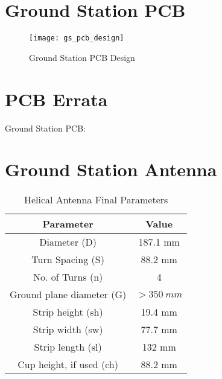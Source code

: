 


\section{Ground Station PCB}\label{sec:appendix_gs_pcb_design}
\begin{figure}[!htb]
  \centering
  \texttt{[image: gs\_pcb\_design]}
  \caption{Ground Station PCB Design}
  \label{fig:gs_pcb}
\end{figure}

\section{PCB Errata}\label{sec:appendix_pcb_errata}
Ground Station PCB:

\section{Ground Station Antenna}
\begin{table}[!htb]
  \centering
  \renewcommand{\arraystretch}{1.2}
  \begin{tabular}{ |c|c| }
  \hline
  \textbf{Parameter}                  & \textbf{Value}    \\
  \hline
  Diameter (D)                        & 187.1 mm          \\ \hline
  Turn Spacing (S)                    & 88.2 mm           \\ \hline
  No. of Turns (n)                    & 4                 \\ \hline
  Ground plane diameter (G)           & $> \SI{350}{mm}$  \\ \hline
  Strip height (sh)                   & 19.4 mm          \\ \hline
  Strip width (sw)                    & 77.7 mm           \\ \hline
  Strip length (sl)                   & 132 mm           \\ \hline
  Cup height, if used (ch)            & 88.2 mm           \\ \hline
  \end{tabular}
  \caption{Helical Antenna Final Parameters}
  \label{tab:helicalParameters}
\end{table}

